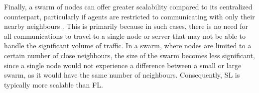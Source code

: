 Finally, a swarm of nodes can offer greater scalability compared to its centralized counterpart, particularly if agents are restricted to communicating with only their nearby neighbours \cite{swarmscalable}. This is primarily because in such cases, there is no need for all communications to travel to a single node or server that may not be able to handle the significant volume of traffic. In a swarm, where nodes are limited to a certain number of close neighbours, the size of the swarm becomes less significant, since a single node would not experience a difference between a small or large swarm, as it would have the same number of neighbours. Consequently, SL is typically more scalable than FL.